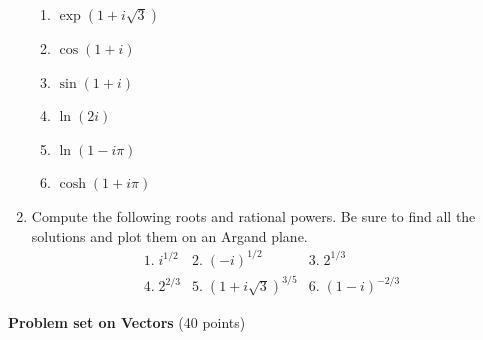 \documentclass[fleqn]{article}
\begin{document}
\begin{enumerate}
  \begin{enumerate}
    \item $\exp \left( 1+i\sqrt{3}\right)$
    
    \item $\cos \left( 1+i\right)$
    
    \item $\sin \left( 1+i\right)$
    
    \item $\ln (2i)$
    
    \item $\ln \left( 1-i\pi \right)$
    
    \item $\cosh \left( 1+i\pi \right)$
  \end{enumerate}
  
  \item Compute the following roots and rational powers. Be sure to find all the solutions and plot them on an Argand plane. 
  \[
  \begin{array}{lll}
  1.\;i^{1/2} & 2.\;\left( -i\right) ^{1/2} & 3.\;2^{1/3} \\ 
  4.\;2^{2/3} & 5.\;(1+i\sqrt{3})^{3/5} & 6.\;\left( 1-i\right) ^{-2/3}
  \end{array}
  \]
  \end{enumerate}


\pagebreak




\textbf{Problem set on Vectors} (40 points)
\end{document}
